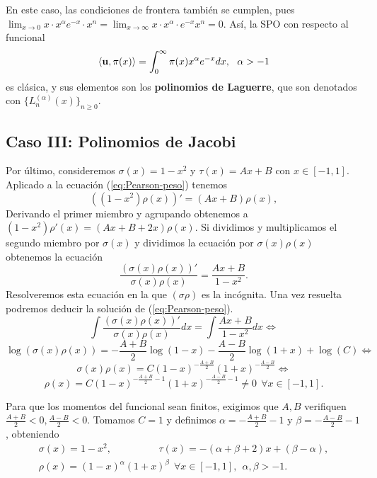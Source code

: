 En este caso, las condiciones de frontera también se cumplen, pues $\displaystyle\lim_{x\rightarrow 0} x\cdot x^{\alpha}e^{-x}\cdot x^n = \displaystyle\lim_{x\rightarrow \infty} x\cdot x^{\alpha}\cdot e^{-x} x^n = 0$. Así, la SPO con respecto al funcional
\begin{equation}
    \label{eq:func-laguerre}
    \prodesc{\uu}{\pi(x)} = \int_{0}^\infty \pi(x)x^{\alpha} e^{-x}dx, \ \ \alpha > -1
\end{equation}
es clásica, y sus elementos son los \textbf{polinomios de Laguerre}, que son denotados con $\{L_n^{(\alpha)}(x)\}_{n\geq 0}$.

\subsection{Caso III: Polinomios de Jacobi}

Por último, consideremos $\sigma(x) = 1-x^2$ y $\tau(x)=Ax+B$ con $x\in[-1,1]$. Aplicado a la ecuación (\ref{eq:Pearson-peso}) tenemos
$$
((1-x^2)\rho(x))'=(Ax+B)\rho(x),
$$
Derivando el primer miembro y agrupando obtenemos a $(1-x^2)\rho'(x)=(Ax+B+2x)\rho(x)$. Si dividimos y multiplicamos el segundo miembro por $\sigma(x)$ y dividimos la ecuación por $\sigma(x)\rho(x)$ obtenemos la ecuación
$$
\dfrac{(\sigma(x)\rho(x))'}{\sigma(x)\rho(x)} = \dfrac{Ax+B}{1-x^2}.
$$
Resolveremos esta ecuación en la que $(\sigma\rho)$ es la incógnita. Una vez resuelta podremos deducir la solución de (\ref{eq:Pearson-peso}).
$$
\int \dfrac{(\sigma(x)\rho(x))'}{\sigma(x)\rho(x)} dx = \int \dfrac{Ax+B}{1-x^2}dx\Leftrightarrow $$ $$\log(\sigma(x)\rho(x)) = -\dfrac{A+B}{2}\log(1-x)-\dfrac{A-B}{2}\log(1+x) + \log(C) \Leftrightarrow $$ $$
 \sigma(x)\rho(x) = C(1-x)^{-\frac{A+B}{2}}(1+x)^{-\frac{A-B}{2}}  \Leftrightarrow$$ $$\rho(x) = C(1-x)^{-\frac{A+B}{2}-1}(1+x)^{-\frac{A-B}{2}-1} \neq 0 \ \ \forall x\in[-1,1].
$$

Para que los momentos del funcional sean finitos, exigimos que $A, B$ verifiquen $\frac{A+B}{2}<0, \frac{A-B}{2}<0$. Tomamos $C=1$ y definimos $\alpha = -\frac{A+B}{2}-1$ y $\beta=-\frac{A-B}{2}-1$, obteniendo
\begin{equation}
    \label{eq:parametros-jacobi}
    \begin{array}{c}
        \sigma(x)=1-x^2,\hspace{2cm} \tau(x)=-(\alpha+\beta+2)x+(\beta-\alpha), \\ 
        \rho(x) =(1-x)^{\alpha}(1+x)^{\beta}\ \ \forall x \in[-1,1], \ \ \alpha,\beta > -1.
    \end{array}
\end{equation}

